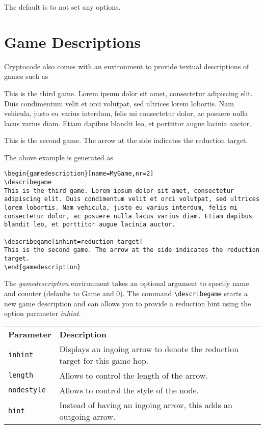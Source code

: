 \documentclass[a4paper]{report}
\begin{document}
The default is to not set any options.

\section{Game Descriptions}
Cryptocode also comes with an environment to provide textual descriptions of games such as


 \begin{gamedescription}[name=MyGame,nr=2]
\describegame
 This is the third game. Lorem ipsum dolor sit amet, consectetur adipiscing elit. Duis condimentum velit et orci volutpat, sed ultrices lorem lobortis. Nam vehicula, justo eu varius interdum, felis mi consectetur dolor, ac posuere nulla lacus varius diam. Etiam dapibus blandit leo, et porttitor augue lacinia auctor.

\describegame[inhint=reduction target]
 This is the second game. The arrow at the side indicates the reduction target.
 \end{gamedescription}

 The above example is generated as

\begin{lstlisting}
\begin{gamedescription}[name=MyGame,nr=2]
\describegame
This is the third game. Lorem ipsum dolor sit amet, consectetur adipiscing elit. Duis condimentum velit et orci volutpat, sed ultrices lorem lobortis. Nam vehicula, justo eu varius interdum, felis mi consectetur dolor, ac posuere nulla lacus varius diam. Etiam dapibus blandit leo, et porttitor augue lacinia auctor.

\describegame[inhint=reduction target]
This is the second game. The arrow at the side indicates the reduction target.
\end{gamedescription}
\end{lstlisting}

The \emph{gamedescription} environment takes an optional argument to specify name and counter (defaults to Game and 0). The command
\lstinline$\describegame$ starts a new game description and can allows you to provide a reduction hint using the option parameter \emph{inhint}.

\begin{center}
\begin{tabular}{ll}
\textbf{Parameter} & \textbf{Description} \\
\lstinline$inhint$ & Displays an ingoing arrow to denote the reduction target for this game hop.\\
\lstinline$length$ & Allows to control the length of the arrow. \\
\lstinline$nodestyle$ & Allows to control the style of the node. \\
\lstinline$hint$ &  Instead of having an ingoing arrow, this adds an outgoing arrow. \\
\end{tabular}
\end{center}
\end{document}
